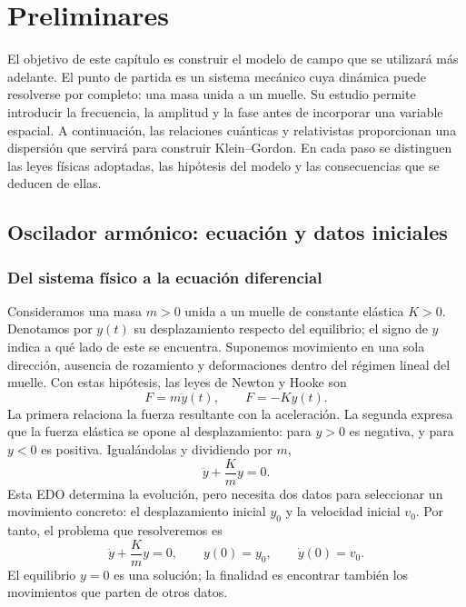\chapter{Preliminares}
\label{ch:preliminares}

El objetivo de este capítulo es construir el modelo de campo que se utilizará
más adelante. El punto de partida es un sistema mecánico cuya dinámica puede
resolverse por completo: una masa unida a un muelle. Su estudio permite
introducir la frecuencia, la amplitud y la fase antes de incorporar una
variable espacial. A continuación, las relaciones cuánticas y relativistas
proporcionan una dispersión que servirá para construir Klein--Gordon.
En cada paso se distinguen las leyes físicas adoptadas, las hipótesis
del modelo y las consecuencias que se deducen de ellas.

\section{Oscilador armónico: ecuación y datos iniciales}
\label{sec:oscilador}

\subsection{Del sistema físico a la ecuación diferencial}
Consideramos una masa $m>0$ unida a un muelle de constante elástica $K>0$.
Denotamos por $y(t)$ su desplazamiento respecto del equilibrio; el signo de
$y$ indica a qué lado de este se encuentra. Suponemos movimiento en una
sola dirección, ausencia de rozamiento y deformaciones dentro del régimen
lineal del muelle. Con estas hipótesis, las leyes de Newton y Hooke son
\[
F=m\ddot y(t),\qquad F=-Ky(t).
\]
La primera relaciona la fuerza resultante con la aceleración. La segunda
expresa que la fuerza elástica se opone al desplazamiento: para $y>0$ es
negativa, y para $y<0$ es positiva. Igualándolas y dividiendo por $m$,
\begin{equation}
\ddot y+\frac Km y=0.
\label{eq:oscilador-edo}
\end{equation}
Esta EDO determina la evolución, pero necesita dos datos para seleccionar
un movimiento concreto: el desplazamiento inicial $y_0$ y la velocidad
inicial $v_0$. Por tanto, el problema que resolveremos es
\[
\ddot y+\frac Km y=0,\qquad y(0)=y_0,\qquad \dot y(0)=v_0.
\]
El equilibrio $y=0$ es una solución; la finalidad es encontrar también
los movimientos que parten de otros datos.

